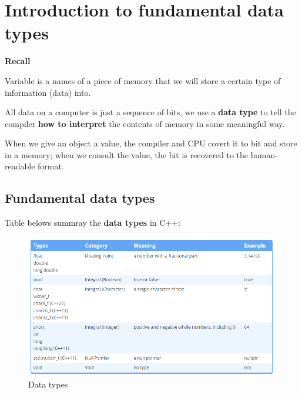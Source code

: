 \documentclass[
  letterpaper,
  DIV=11,
  numbers=noendperiod]{scrreprt}
\begin{document}
\hypertarget{introduction-to-fundamental-data-types}{%
\section{Introduction to fundamental data
types}\label{introduction-to-fundamental-data-types}}

\begin{tcolorbox}[enhanced jigsaw, toprule=.15mm, rightrule=.15mm, opacityback=0, breakable, leftrule=.75mm, colback=white, colframe=quarto-callout-note-color-frame, arc=.35mm, left=2mm, bottomrule=.15mm]
\begin{minipage}[t]{5.5mm}
\textcolor{quarto-callout-note-color}{\faInfo}
\end{minipage}%
\begin{minipage}[t]{\textwidth - 5.5mm}

\textbf{Recall}\vspace{2mm}

Variable is a names of a piece of memory that we will store a certain
type of information (data) into.

\end{minipage}%
\end{tcolorbox}

All data on a computer is just a sequence of bits, we use a \textbf{data
type} to tell the compiler \textbf{how to interpret} the contents of
memory in some meaningful way.

When we give an object a value, the compiler and CPU covert it to bit
and store in a memory; when we consult the value, the bit is recovered
to the human-readable format.

\hypertarget{fundamental-data-types-1}{%
\subsection{Fundamental data types}\label{fundamental-data-types-1}}

Table belows summray the \textbf{data types} in C++:

\begin{figure}

{\centering \includegraphics{./figure/dataTypes.PNG}

}

\caption{\label{fig-dataTypes}Data types}

\end{figure}
\end{document}
